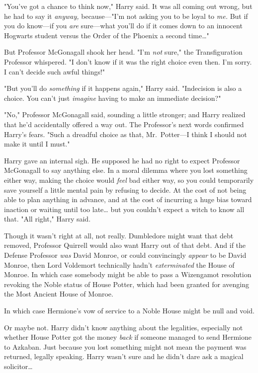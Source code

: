 "You've got a chance to think now," Harry said. It was all coming out wrong, but he had to say it \emph{anyway,} because---"I'm not asking you to be loyal to \emph{me.} But if you do know---if you \emph{are} sure---what you'll do if it comes down to an innocent Hogwarts student versus the Order of the Phoenix a second time{\ldots}"

But Professor McGonagall shook her head. "I'm \emph{not} sure," the Transfiguration Professor whispered. "I don't know if it was the right choice even then. I'm sorry. I can't decide such awful things!"

"But you'll do \emph{something} if it happens again," Harry said. "Indecision is also a choice. You can't just \emph{imagine} having to make an immediate decision?"

"No," Professor McGonagall said, sounding a little stronger; and Harry realized that he'd accidentally offered a way out. The Professor's next words confirmed Harry's fears. "Such a dreadful choice as that, Mr.~Potter---I think I should not make it until I must."

Harry gave an internal sigh. He supposed he had no right to expect Professor McGonagall to say anything else. In a moral dilemma where you lost something either way, making the choice would \emph{feel} bad either way, so you could temporarily save yourself a little mental pain by refusing to decide. At the cost of not being able to plan anything in advance, and at the cost of incurring a huge bias toward inaction or waiting until too late{\ldots} but you couldn't expect a witch to know all that. "All right," Harry said.

Though it wasn't right at all, not really. Dumbledore might want that debt removed, Professor Quirrell would also want Harry out of that debt. And if the Defense Professor \emph{was} David Monroe, or could convincingly \emph{appear} to be David Monroe, then Lord Voldemort technically hadn't \emph{exterminated} the House of Monroe. In which case somebody might be able to pass a Wizengamot resolution revoking the Noble status of House Potter, which had been granted for avenging the Most Ancient House of Monroe.

In which case Hermione's vow of service to a Noble House might be null and void.

Or maybe not. Harry didn't know anything about the legalities, especially not whether House Potter got the money \emph{back} if someone managed to send Hermione to Azkaban. Just because you lost something might not mean the payment was returned, legally speaking. Harry wasn't sure and he didn't dare ask a magical solicitor{\ldots}

